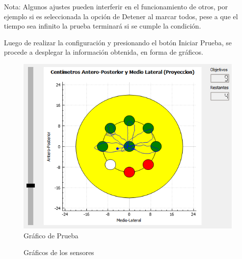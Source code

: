 \documentclass[12pt,a4paper]{article}
\begin{document}
Nota: Algunos ajustes pueden interferir en el funcionamiento de otros, por ejemplo si es seleccionada la opción de Detener al marcar todos, pese a que el tiempo sea infinito la prueba terminará si se cumple la condición.

\newpage
Luego de realizar la configuración y presionando el botón Iniciar Prueba, se procede a desplegar la información obtenida, en forma de gráficos.

\begin{figure}[H]
	\centering
	\includegraphics[scale=0.8]{images/graficoPrincipal}
	\caption{Gráfico de Prueba}
	\label{fig:graficoPrincipal}
\end{figure}


\begin{figure}[H]
	\centering
	\caption{Gráficos de los sensores}
	\label{fig:Graficosensores}
\end{figure}
\end{document}
